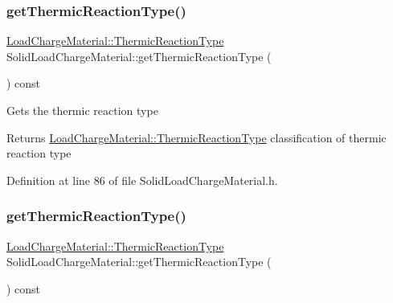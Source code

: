 \mbox{\label{class_solid_load_charge_material_a11708312a99ab985d980e1e521e0864c}} 
\subsubsection{\texorpdfstring{get\+Thermic\+Reaction\+Type()}{getThermicReactionType()}\hspace{0.1cm}{\footnotesize\ttfamily [2/3]}}
{\footnotesize\ttfamily \hyperlink{namespace_load_charge_material_a51d4263e865a5d86236622dd3fe23fd1}{Load\+Charge\+Material\+::\+Thermic\+Reaction\+Type} Solid\+Load\+Charge\+Material\+::get\+Thermic\+Reaction\+Type (\begin{DoxyParamCaption}{ }\end{DoxyParamCaption}) const\hspace{0.3cm}{\ttfamily [inline]}}

Gets the thermic reaction type \begin{DoxyReturn}{Returns}
\hyperlink{namespace_load_charge_material_a51d4263e865a5d86236622dd3fe23fd1}{Load\+Charge\+Material\+::\+Thermic\+Reaction\+Type} classification of thermic reaction type 
\end{DoxyReturn}


Definition at line 86 of file Solid\+Load\+Charge\+Material.\+h.

\mbox{\label{class_solid_load_charge_material_a11708312a99ab985d980e1e521e0864c}} 
\subsubsection{\texorpdfstring{get\+Thermic\+Reaction\+Type()}{getThermicReactionType()}\hspace{0.1cm}{\footnotesize\ttfamily [3/3]}}
{\footnotesize\ttfamily \hyperlink{namespace_load_charge_material_a51d4263e865a5d86236622dd3fe23fd1}{Load\+Charge\+Material\+::\+Thermic\+Reaction\+Type} Solid\+Load\+Charge\+Material\+::get\+Thermic\+Reaction\+Type (\begin{DoxyParamCaption}{ }\end{DoxyParamCaption}) const\hspace{0.3cm}{\ttfamily [inline]}}

